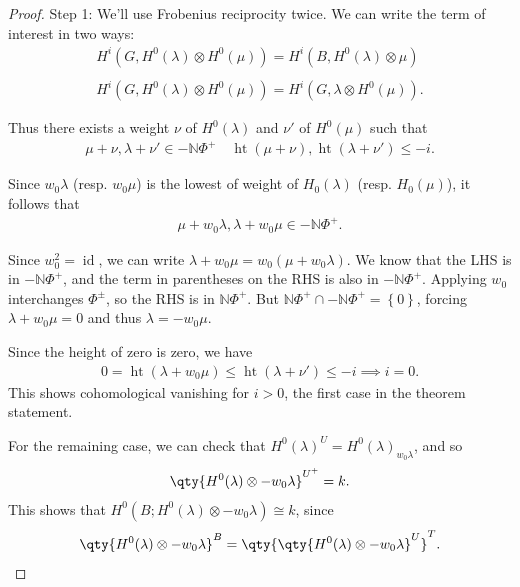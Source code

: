 \begin{proof}

Step 1: We'll use Frobenius reciprocity twice. We can write the term of
interest in two ways:
\begin{align*}  
H^i(G, H^0(\lambda) \otimes H^0(\mu)) =
H^i(B, H^0(\lambda) \otimes\mu)
\\ \\
H^i(G, H^0(\lambda) \otimes H^0(\mu)) =
H^i(G, \lambda \otimes H^0(\mu))
.\end{align*}

Thus there exists a weight \(\nu\) of \(H^0(\lambda)\) and \(\nu'\) of
\(H^0(\mu)\) such that
\begin{align*}  
\mu + \nu, \lambda + \nu' \in - {\mathbb{N}}\Phi^+ \quad \operatorname{ht}(\mu+\nu), \operatorname{ht}(\lambda + \nu') \leq -i
.\end{align*}

Since \(w_0\lambda\) (resp. \(w_0\mu\)) is the lowest of weight of
\(H_0(\lambda)\) (resp. \(H_0(\mu)\)), it follows that
\begin{align*}  
\mu + w_0 \lambda, \lambda + w_0\mu \in -{\mathbb{N}}\Phi^+
.\end{align*}

Since \(w_0^2 = \operatorname{id}\), we can write
\(\lambda + w_0\mu = w_0(\mu + w_0 \lambda)\). We know that the LHS is
in \(-{\mathbb{N}}\Phi^+\), and the term in parentheses on the RHS is
also in \(-{\mathbb{N}}\Phi^+\). Applying \(w_0\) interchanges
\(\Phi^\pm\), so the RHS is in \({\mathbb{N}}\Phi^+\). But
\({\mathbb{N}}\Phi^+ \cap-{\mathbb{N}}\Phi^+ = \left\{{0}\right\}\),
forcing \(\lambda + w_0 \mu = 0\) and thus \(\lambda = -w_0 \mu\).

Since the height of zero is zero, we have
\begin{align*}  
0 = \operatorname{ht}(\lambda + w_0 \mu)
\leq \operatorname{ht}(\lambda + \nu') \leq -i \implies i=0
.\end{align*}
This shows cohomological vanishing for \(i>0\), the first case in the
theorem statement.

For the remaining case, we can check that
\(H^0(\lambda)^{U} = H^0(\lambda)_{w_0 \lambda}\), and so
\begin{align*}  
\qty{H^0(\lambda) \otimes-w_0 \lambda}^{U^+} = k
.\end{align*}
This shows that \(H^0(B; H^0(\lambda) \otimes-w_0\lambda ) \cong k\),
since
\begin{align*}  
\qty{H^0(\lambda) \otimes-w_0 \lambda}^B = \qty{ \qty{H^0(\lambda) \otimes-w_0 \lambda }^U }^T
.\end{align*}

\end{proof}

